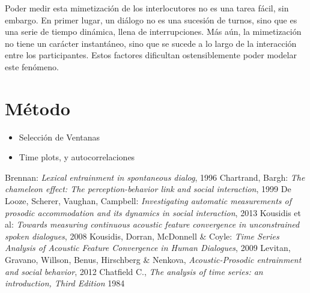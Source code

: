 \documentclass[11pt,a4paper,twoside]{tesis}
\begin{document}
Poder medir esta mimetización de los interlocutores no es una tarea fácil, sin embargo. En primer lugar, un diálogo no es una sucesión de turnos, sino que es una serie de tiempo dinámica, llena de interrupciones. Más aún, la mimetización no tiene un carácter instantáneo, sino que se sucede a lo largo de la interacción entre los participantes. Estos factores dificultan ostensiblemente poder modelar este fenómeno.






\section{Método}

\begin{itemize}
\item Selección de Ventanas
\item Time plots, y autocorrelaciones
\end{itemize}

\backmatter
\begin{thebibliography}{9}
    Brennan:
    \emph{Lexical entrainment in spontaneous dialog},
    1996
    Chartrand, Bargh:
    \emph{The chameleon effect: The perception-behavior link and social interaction},
    1999
    De Looze, Scherer, Vaughan, Campbell:
    \emph{Investigating automatic measurements of prosodic accommodation and its dynamics in social interaction},
    2013
    Kousidis et al:
    \emph{Towards measuring continuous acoustic feature convergence in unconstrained spoken dialogues},
    2008
    Kousidis, Dorran, McDonnell \& Coyle:
    \emph{Time Series Analysis of Acoustic Feature Convergence in Human Dialogues},
    2009
    Levitan, Gravano, Willson, Benus, Hirschberg \& Nenkova,
    \emph{Acoustic-Prosodic entrainment and social behavior},
    2012
    Chatfield C.,
    \emph{The analysis of time series: an introduction, Third Edition}
    1984
\end{thebibliography}
\end{document}
